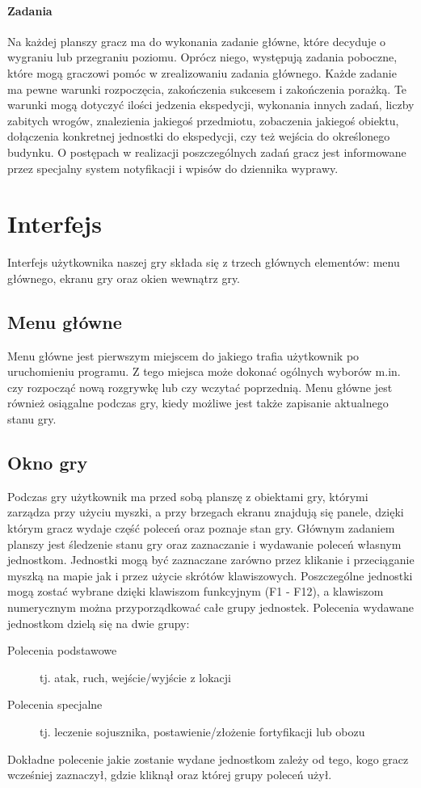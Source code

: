 \documentclass[licencjacka]{pracamgr}
\begin{document}
    \paragraph{Zadania}
      Na każdej planszy gracz ma do wykonania zadanie główne, które decyduje o wygraniu lub przegraniu poziomu. Oprócz niego,
      występują zadania poboczne, które mogą graczowi pomóc w zrealizowaniu zadania głównego. Każde zadanie ma pewne warunki
      rozpoczęcia, zakończenia sukcesem i zakończenia porażką. Te warunki mogą dotyczyć ilości jedzenia ekspedycji, wykonania innych zadań,
      liczby zabitych wrogów, znalezienia jakiegoś przedmiotu, zobaczenia jakiegoś obiektu, dołączenia konkretnej jednostki do ekspedycji,
      czy też wejścia do określonego budynku. O postępach w realizacji poszczególnych zadań gracz jest informowane przez specjalny system notyfikacji
      i wpisów do dziennika wyprawy.



  \section{Interfejs}
    Interfejs użytkownika naszej gry składa się z trzech głównych elementów: menu głównego, ekranu gry oraz okien wewnątrz gry.

    \subsection{Menu główne}
      Menu główne jest pierwszym miejscem do jakiego trafia użytkownik po uruchomieniu programu. Z tego miejsca może dokonać ogólnych wyborów m.in. czy
      rozpocząć nową rozgrywkę lub czy wczytać poprzednią. Menu główne jest również osiągalne podczas gry, kiedy możliwe jest także zapisanie aktualnego stanu gry.

    \subsection{Okno gry}
      Podczas gry użytkownik ma przed sobą planszę z obiektami gry, którymi zarządza przy użyciu myszki, a przy brzegach ekranu znajdują się panele,
      dzięki którym gracz wydaje część poleceń oraz poznaje stan gry. Głównym zadaniem planszy jest śledzenie stanu gry oraz zaznaczanie i wydawanie poleceń
      własnym jednostkom. Jednostki mogą być zaznaczane zarówno przez klikanie i przeciąganie myszką na mapie jak i przez użycie skrótów klawiszowych.
      Poszczególne jednostki mogą zostać wybrane dzięki klawiszom funkcyjnym (F1 - F12), a klawiszom numerycznym można przyporządkować całe grupy jednostek.
      Polecenia wydawane jednostkom dzielą się na dwie grupy:
      \begin{description}
       \item[Polecenia podstawowe] tj. atak, ruch, wejście/wyjście z lokacji
       \item[Polecenia specjalne] tj. leczenie sojusznika, postawienie/złożenie fortyfikacji lub obozu
      \end{description}
      Dokładne polecenie jakie zostanie wydane jednostkom zależy od tego, kogo gracz wcześniej zaznaczył, gdzie kliknął oraz której grupy poleceń użył.
\end{document}

